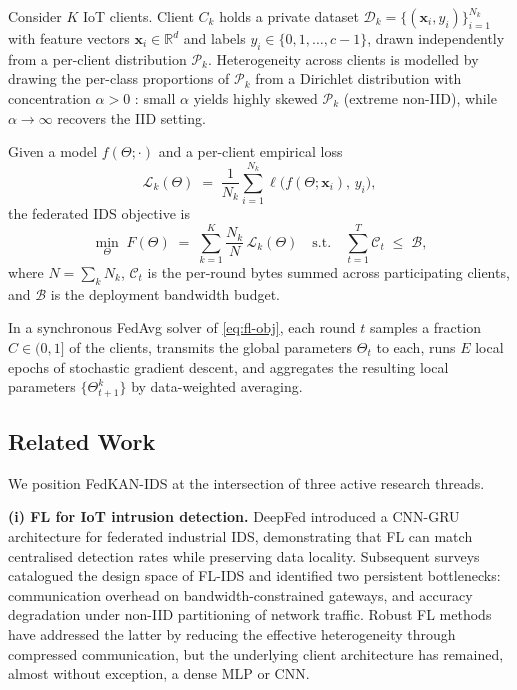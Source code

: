 \begin{definition}\label{def:fl-ids}
Consider $K$ IoT clients. Client $C_k$ holds a private dataset $\mathcal{D}_k = \{(\mathbf{x}_i, y_i)\}_{i=1}^{N_k}$ with feature vectors $\mathbf{x}_i \in \mathbb{R}^d$ and labels $y_i \in \{0, 1, \ldots, c-1\}$, drawn independently from a per-client distribution $\mathcal{P}_k$. Heterogeneity across clients is modelled by drawing the per-class proportions of $\mathcal{P}_k$ from a Dirichlet distribution with concentration $\alpha > 0$ \cite{hsu2019measuring}: small $\alpha$ yields highly skewed $\mathcal{P}_k$ (extreme non-IID), while $\alpha \to \infty$ recovers the IID setting.

Given a model $f(\Theta; \cdot)$ and a per-client empirical loss
\begin{equation}
\mathcal{L}_k(\Theta) \;=\; \frac{1}{N_k}\sum_{i=1}^{N_k} \ell\big(f(\Theta; \mathbf{x}_i),\, y_i\big),
\end{equation}
the federated IDS objective is
\begin{equation}\label{eq:fl-obj}
\min_{\Theta} \; F(\Theta) \;=\; \sum_{k=1}^{K} \frac{N_k}{N}\, \mathcal{L}_k(\Theta) \quad\text{s.t.}\quad \sum_{t=1}^{T} \mathcal{C}_t \;\leq\; \mathcal{B},
\end{equation}
where $N = \sum_k N_k$, $\mathcal{C}_t$ is the per-round bytes summed across participating clients, and $\mathcal{B}$ is the deployment bandwidth budget.
\end{definition}

In a synchronous FedAvg \cite{mcmahan2017fedavg} solver of \eqref{eq:fl-obj}, each round $t$ samples a fraction $C \in (0, 1]$ of the clients, transmits the global parameters $\Theta_t$ to each, runs $E$ local epochs of stochastic gradient descent, and aggregates the resulting local parameters $\{\Theta_{t+1}^k\}$ by data-weighted averaging.

\subsection{Related Work}\label{subsec:related}

We position FedKAN-IDS at the intersection of three active research threads.

\textbf{(i) FL for IoT intrusion detection.} DeepFed \cite{li2020deepfed} introduced a CNN-GRU architecture for federated industrial IDS, demonstrating that FL can match centralised detection rates while preserving data locality. Subsequent surveys \cite{nguyen2021fl-iot-survey} catalogued the design space of FL-IDS and identified two persistent bottlenecks: communication overhead on bandwidth-constrained gateways, and accuracy degradation under non-IID partitioning of network traffic. Robust FL methods \cite{sattler2019sparse} have addressed the latter by reducing the effective heterogeneity through compressed communication, but the underlying client architecture has remained, almost without exception, a dense MLP or CNN.

